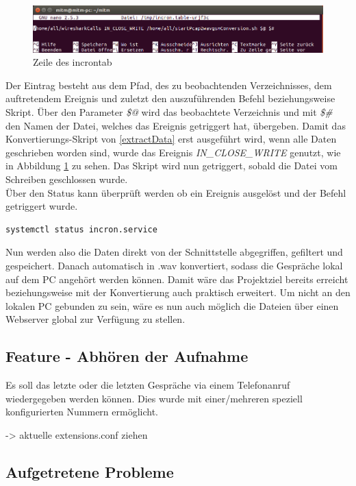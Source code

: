 \begin{figure}[h] %
\centering
\includegraphics[width=15cm]{includes/incrontab}
\caption{Zeile des incrontab}
\label{fig:incrontab}
\end{figure}


Der Eintrag besteht aus dem Pfad, des zu beobachtenden Verzeichnisses, dem auftretendem Ereignis und zuletzt den auszuführenden Befehl beziehungsweise Skript. Über den Parameter \textit{\$@}  wird das beobachtete Verzeichnis und mit \textit{\$\#} den Namen der Datei, welches das Ereignis getriggert hat, übergeben. Damit das Konvertierungs-Skript von \ref{extractData} erst ausgeführt wird, wenn alle Daten geschrieben worden sind, wurde das Ereignis \textit{IN\_CLOSE\_WRITE} genutzt, wie in Abbildung \ref{fig:incrontab} zu sehen. Das Skript wird nun getriggert, sobald die Datei vom Schreiben geschlossen wurde.\\

Über den Status kann überprüft werden ob ein Ereignis ausgelöst und der Befehl getriggert wurde.

\begin{lstlisting}
systemctl status incron.service
\end{lstlisting}


Nun werden also die Daten direkt von der Schnittstelle abgegriffen, gefiltert und gespeichert. Danach automatisch in .wav konvertiert, sodass die Gespräche lokal auf dem PC angehört werden können. Damit wäre das Projektziel bereits erreicht beziehungsweise mit der Konvertierung auch praktisch erweitert. Um nicht an den lokalen PC gebunden zu sein, wäre es nun auch möglich die Dateien über einen Webserver global zur Verfügung zu stellen.

\subsection{Feature - Abhören der Aufnahme}
Es soll das letzte oder die letzten Gespräche via einem Telefonanruf wiedergegeben werden können. Dies wurde mit einer/mehreren speziell konfigurierten Nummern ermöglicht.

-> aktuelle extensions.conf ziehen


\subsection{Aufgetretene Probleme}

